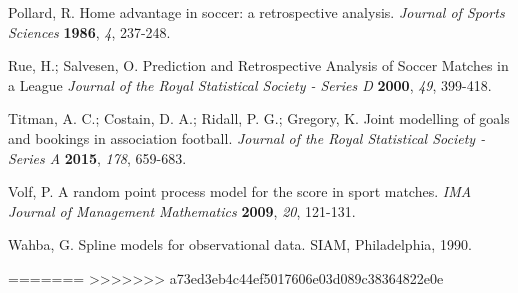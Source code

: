 \documentclass[journal,article,accept,moreauthors,pdftex,12pt,a4paper]{mdpi}
\begin{document}
\begin{thebibliography}{999}
Pollard, R. Home advantage in soccer: a retrospective analysis. {\em Journal of Sports Sciences} {\bf 1986}, {\em 4}, 237-248.

Rue, H.; Salvesen, O. Prediction and Retrospective Analysis of
Soccer Matches in a League {\em Journal of the Royal Statistical
Society - Series D} {\bf 2000}, {\em 49}, 399-418.

Titman, A. C.; Costain, D. A.; Ridall, P. G.; Gregory, K. Joint
modelling of goals and bookings in association football. {\em
Journal of the Royal Statistical Society - Series A} {\bf 2015},
{\em 178}, 659-683.

Volf, P. A random point process model for the score in sport
matches. {\em IMA Journal of Management Mathematics} {\bf 2009},
{\em 20}, 121-131.

Wahba, G. Spline models for observational data. SIAM, Philadelphia,
1990.

\end{thebibliography}

%
%


%


%
=======
>>>>>>> a73ed3eb4c44ef5017606e03d089c38364822e0e
\end{document}
